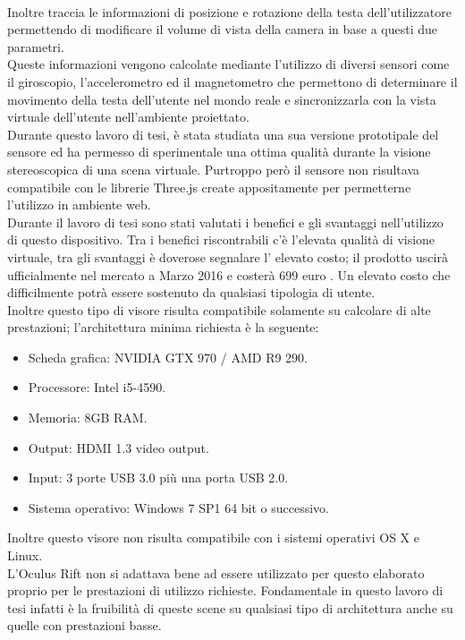 \\
Inoltre traccia le informazioni di posizione e rotazione della testa dell’utilizzatore permettendo di modificare il volume di vista della camera in base a questi due parametri.
\\
Queste informazioni vengono calcolate mediante l’utilizzo di diversi sensori come il giroscopio, l’accelerometro ed il magnetometro che permettono di determinare il movimento della testa dell’utente nel mondo reale e sincronizzarla con la vista virtuale dell’utente nell’ambiente proiettato.
\\
Durante questo lavoro di tesi, è stata studiata una sua versione prototipale del sensore ed ha permesso di sperimentale una ottima qualità durante la visione stereoscopica di una scena virtuale. Purtroppo però il sensore non risultava compatibile con le librerie Three.js create appositamente per permetterne l'utilizzo in ambiente web.
\\
Durante il lavoro di tesi sono stati valutati i benefici e gli svantaggi nell’utilizzo di questo dispositivo. Tra i benefici riscontrabili c’è l’elevata qualità di visione virtuale, tra gli svantaggi è doverose segnalare l’ elevato costo; il prodotto uscirà ufficialmente nel mercato a Marzo 2016 e costerà 699 euro \cite{oculus_prezzo}.
Un elevato costo che difficilmente potrà essere sostenuto da qualsiasi tipologia di utente.
\\
Inoltre questo tipo di visore risulta compatibile solamente su calcolare di alte prestazioni; l’architettura minima richiesta è la seguente: \cite{oculus_pc_compat}
\begin{itemize}
\item Scheda grafica: NVIDIA GTX 970 / AMD R9 290.
\item Processore: Intel i5-4590.
\item Memoria: 8GB RAM.
\item Output: HDMI 1.3 video output.
\item Input: 3 porte USB 3.0 più una porta USB 2.0.
\item Sistema operativo: Windows 7 SP1 64 bit o successivo.
\end{itemize}
Inoltre questo visore non risulta compatibile con i sistemi operativi OS X e Linux.\cite{oculus_mac}
\\
L’Oculus Rift non si adattava bene ad essere utilizzato per questo elaborato proprio per le prestazioni di utilizzo richieste. Fondamentale in questo lavoro di tesi infatti è la fruibilità di queste scene su qualsiasi tipo di architettura anche su quelle con prestazioni basse.

